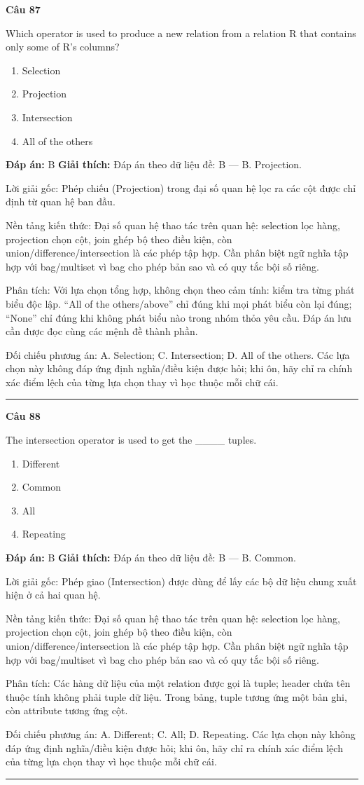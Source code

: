 \documentclass[11pt,a4paper]{article}
\newenvironment{question}[1]{%
  \par\vspace{1em}\noindent\textbf{\large Câu #1}\par\vspace{0.4em}
}{%
  \par\vspace{1em}\hrule\vspace{0.6em}
}
\newenvironment{choices}{%
  \begin{enumerate}[label=\textbf{\Alph*.},leftmargin=2.2em,itemsep=2pt,topsep=3pt]
}{%
  \end{enumerate}
}
\newcommand{\choice}{\item}
\begin{document}
\begin{question}{87}
Which operator is used to produce a new relation from a relation R that contains only some of R's columns?
\begin{choices}
\choice Selection
\choice Projection
\choice Intersection
\choice All of the others
\end{choices}
\textbf{Đáp án:} B
\textbf{Giải thích:} Đáp án theo dữ liệu đề: B — B. Projection.

Lời giải gốc: Phép chiếu (Projection) trong đại số quan hệ lọc ra các cột được chỉ định từ quan hệ ban đầu.

Nền tảng kiến thức: Đại số quan hệ thao tác trên quan hệ: selection lọc hàng, projection chọn cột, join ghép bộ theo điều kiện, còn union/difference/intersection là các phép tập hợp. Cần phân biệt ngữ nghĩa tập hợp với bag/multiset vì bag cho phép bản sao và có quy tắc bội số riêng.

Phân tích: Với lựa chọn tổng hợp, không chọn theo cảm tính: kiểm tra từng phát biểu độc lập. “All of the others/above” chỉ đúng khi mọi phát biểu còn lại đúng; “None” chỉ đúng khi không phát biểu nào trong nhóm thỏa yêu cầu. Đáp án lưu cần được đọc cùng các mệnh đề thành phần.

Đối chiếu phương án: A. Selection; C. Intersection; D. All of the others. Các lựa chọn này không đáp ứng định nghĩa/điều kiện được hỏi; khi ôn, hãy chỉ ra chính xác điểm lệch của từng lựa chọn thay vì học thuộc mỗi chữ cái.
\end{question}

\begin{question}{88}
The intersection operator is used to get the ____ tuples.
\begin{choices}
\choice Different
\choice Common
\choice All
\choice Repeating
\end{choices}
\textbf{Đáp án:} B
\textbf{Giải thích:} Đáp án theo dữ liệu đề: B — B. Common.

Lời giải gốc: Phép giao (Intersection) được dùng để lấy các bộ dữ liệu chung xuất hiện ở cả hai quan hệ.

Nền tảng kiến thức: Đại số quan hệ thao tác trên quan hệ: selection lọc hàng, projection chọn cột, join ghép bộ theo điều kiện, còn union/difference/intersection là các phép tập hợp. Cần phân biệt ngữ nghĩa tập hợp với bag/multiset vì bag cho phép bản sao và có quy tắc bội số riêng.

Phân tích: Các hàng dữ liệu của một relation được gọi là tuple; header chứa tên thuộc tính không phải tuple dữ liệu. Trong bảng, tuple tương ứng một bản ghi, còn attribute tương ứng cột.

Đối chiếu phương án: A. Different; C. All; D. Repeating. Các lựa chọn này không đáp ứng định nghĩa/điều kiện được hỏi; khi ôn, hãy chỉ ra chính xác điểm lệch của từng lựa chọn thay vì học thuộc mỗi chữ cái.
\end{question}
\end{document}
